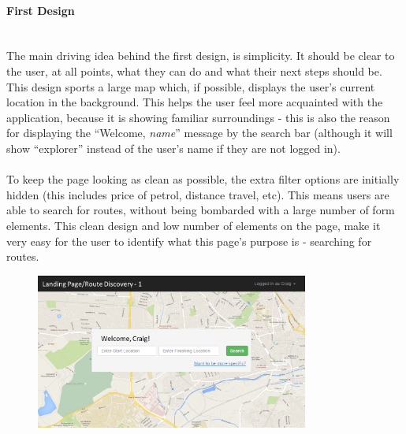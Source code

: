 \documentclass[a4paper,twoside,notitlepage,11pt]{article}
\begin{document}
\paragraph{First Design}\ \\
The main driving idea behind the first design, is simplicity. It should be clear to the user, at all points, what they can do and what their next steps should be. This design sports a large map which, if possible, displays the user's current location in the background. This helps the user feel more acquainted with the application, because it is showing familiar surroundings - this is also the reason for displaying the ``Welcome, \textit{name}'' message by the search bar (although it will show ``explorer'' instead of the user's name if they are not logged in).\ \\
\ \\
To keep the page looking as clean as possible, the extra filter options are initially hidden (this includes price of petrol, distance travel, etc). This means users are able to search for routes, without being bombarded with a large number of form elements. This clean design and low number of elements on the page, make it very easy for the user to identify what this page's purpose is - searching for routes.
\begin{figure}[!ht]
\vspace{6mm}
 \begin{center}
		\includegraphics[width=0.8\textwidth]{images/ui-landing-1.png}
	\end{center}
	\vspace{-6mm}
\end{figure}\ \\

\newpage 
\end{document}
